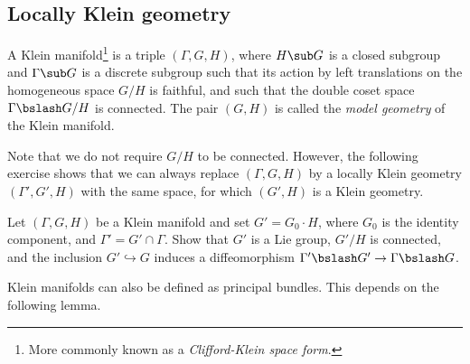 \subsection{Locally Klein geometry}


\begin{defn}
    A Klein manifold\footnote{More commonly known as a \emph{Clifford-Klein space form}.} is a triple $(\Gamma,G,H)$, where $H\sub G$ is a closed subgroup and $\Gamma\sub G$ is a discrete subgroup such that its action by left translations on the homogeneous space $G\slash H$ is faithful, and such that the double coset space $\Gamma\bslash G\slash H$ is connected. The pair $(G,H)$ is called the \emph{model geometry} of the Klein manifold.
\end{defn}

Note that we do not require $G\slash H$ to be connected. However, the following exercise shows that we can always replace $(\Gamma,G,H)$ by a locally Klein geometry $(\Gamma',G',H)$ with the same space, for which $(G',H)$ is a Klein geometry.

\begin{xca}
    Let $(\Gamma,G,H)$ be a Klein manifold and set $G'=G_0\cdot H$, where $G_0$ is the identity component, and $\Gamma'=G'\cap \Gamma$. Show that $G'$ is a Lie group, $G'\slash H$ is connected, and the inclusion $G'\hookrightarrow G$ induces a diffeomorphism $\Gamma'\bslash G'\to \Gamma\bslash G$.
\end{xca}

Klein manifolds can also be defined as principal bundles. This depends on the following lemma.

